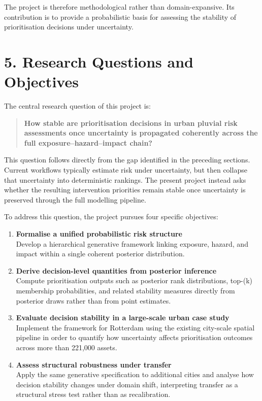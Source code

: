 \documentclass[
]{article}
\begin{document}
The project is therefore methodological rather than domain-expansive.
Its contribution is to provide a probabilistic basis for assessing the
stability of prioritisation decisions under uncertainty.

\section{5. Research Questions and
Objectives}\label{research-questions-and-objectives}

The central research question of this project is:

\begin{quote}
\textbf{How stable are prioritisation decisions in urban pluvial risk
assessments once uncertainty is propagated coherently across the full
exposure--hazard--impact chain?}
\end{quote}

This question follows directly from the gap identified in the preceding
sections. Current workflows typically estimate risk under uncertainty,
but then collapse that uncertainty into deterministic rankings. The
present project instead asks whether the resulting intervention
priorities remain stable once uncertainty is preserved through the full
modelling pipeline.

To address this question, the project pursues four specific objectives:

\begin{enumerate}
\def\labelenumi{\arabic{enumi}.}
\item
  \textbf{Formalise a unified probabilistic risk structure}\\
  Develop a hierarchical generative framework linking exposure, hazard,
  and impact within a single coherent posterior distribution.
\item
  \textbf{Derive decision-level quantities from posterior inference}\\
  Compute prioritisation outputs such as posterior rank distributions,
  top-(k) membership probabilities, and related stability measures
  directly from posterior draws rather than from point estimates.
\item
  \textbf{Evaluate decision stability in a large-scale urban case
  study}\\
  Implement the framework for Rotterdam using the existing city-scale
  spatial pipeline in order to quantify how uncertainty affects
  prioritisation outcomes across more than 221,000 assets.
\item
  \textbf{Assess structural robustness under transfer}\\
  Apply the same generative specification to additional cities and
  analyse how decision stability changes under domain shift,
  interpreting transfer as a structural stress test rather than as
  recalibration.
\end{enumerate}
\end{document}
